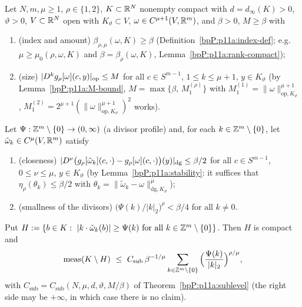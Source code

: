 \begin{theorem}[Measure of the set where the divisors are large; Rus01 Thm 18.5 with $p=q=0$]\label{bpP:p11a:diophantine-measure}
Let $N,m,\mu\ge1$, $\rho\in\{1,2\}$, $K\subset\mathbb{R}^N$ nonempty compact with $d=d_\infty(K)>0$, $\vartheta>0$, $V\subset\mathbb{R}^N$ open with $K_\vartheta\subset V$, $\omega\in C^{\mu+1}(V,\mathbb{R}^m)$, and $\beta>0$, $M\ge\beta$ with
\begin{enumerate}[label=(D\arabic*),ref=(D\arabic*)]
\item\label{bpP:p11a:D1} (index and amount) $\beta_{\rho,\mu}(\omega,K)\ge\beta$ (Definition~\ref{bpP:p11a:index-def}; e.g.\ $\mu\ge\mu_0(\rho,\omega,K)$ and $\beta=\beta_\rho(\omega,K)$, Lemma~\ref{bpP:p11a:rank-compact});
\item\label{bpP:p11a:D2} (size) $\lvert D^kg_\rho[\omega](c,y)\rvert_{\mathrm{op}}\le M$ for all $c\in S^{m-1}$, $1\le k\le\mu+1$, $y\in K_\vartheta$ (by Lemma~\ref{bpP:p11a:M-bound}, $M=\max\{\beta,\,M_1^{(\rho)}\}$ with $M_1^{(1)}=\lVert\omega\rVert^{\mu+1}_{\mathrm{op},K_\vartheta}$, $M_1^{(2)}=2^{\mu+1}(\lVert\omega\rVert^{\mu+1}_{\mathrm{op},K_\vartheta})^2$ works).
\end{enumerate}
Let $\Psi:\mathbb{Z}^m\setminus\{0\}\to(0,\infty)$ (a divisor profile) and, for each $k\in\mathbb{Z}^m\setminus\{0\}$, let $\tilde\omega_k\in C^\mu(V,\mathbb{R}^m)$ satisfy
\begin{enumerate}[label=(D\arabic*),ref=(D\arabic*),resume]
\item\label{bpP:p11a:D3} (closeness) $\lvert D^\nu\big(g_\rho[\tilde\omega_k](c,\cdot)-g_\rho[\omega](c,\cdot)\big)(y)\rvert_{\mathrm{dg}}\le\beta/2$ for all $c\in S^{m-1}$, $0\le\nu\le\mu$, $y\in K_\vartheta$ (by Lemma~\ref{bpP:p11a:stability}: it suffices that $\eta_\rho(\theta_k)\le\beta/2$ with $\theta_k=\lVert\tilde\omega_k-\omega\rVert^\mu_{\mathrm{dg},K_\vartheta}$);
\item\label{bpP:p11a:D4} (smallness of the divisors) $\big(\Psi(k)/\lvert k\rvert_2\big)^\rho<\beta/4$ for all $k\ne0$.
\end{enumerate}
Put $H:=\{b\in K:\ \lvert k\cdot\tilde\omega_k(b)\rvert\ge\Psi(k)\ \text{for all }k\in\mathbb{Z}^m\setminus\{0\}\}$. Then $H$ is compact and
\[\operatorname{meas}(K\setminus H)\ \le\ C_{\mathrm{sub}}\,\beta^{-1/\mu}\sum_{k\in\Z^m\setminus\{0\}}\Big(\frac{\Psi(k)}{\lvert k\rvert_2}\Big)^{\rho/\mu},\]
with $C_{\mathrm{sub}}=C_{\mathrm{sub}}(N,\mu,d,\vartheta,M/\beta)$ of Theorem~\ref{bpP:p11a:sublevel} (the right side may be $+\infty$, in which case there is no claim).
\end{theorem}
